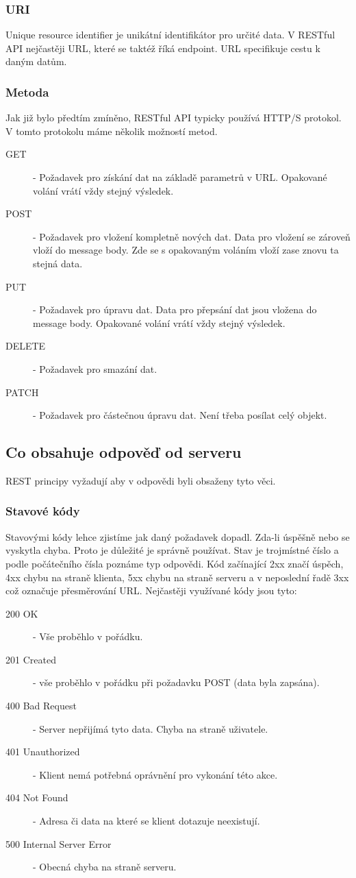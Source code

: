 \subsubsection{URI}
Unique resource identifier je unikátní identifikátor pro určité data. V RESTful API nejčastěji URL, které se taktéž říká endpoint. URL specifikuje cestu k daným datům.
\subsubsection{Metoda}
Jak již bylo předtím zmíněno, RESTful API typicky používá HTTP/S protokol. V tomto protokolu máme několik možností metod.

\begin{description}
	\item[GET] - Požadavek pro získání dat na základě parametrů v URL. Opakované volání vrátí vždy stejný výsledek.
	\item[POST] - Požadavek pro vložení kompletně nových dat. Data pro vložení se zároveň vloží do message body. Zde se s opakovaným voláním vloží zase znovu ta stejná data.
	\item[PUT] - Požadavek pro úpravu dat. Data pro přepsání dat jsou vložena do message body. Opakované volání vrátí vždy stejný výsledek.
	\item[DELETE] - Požadavek pro smazání dat.
	\item[PATCH] - Požadavek pro částečnou úpravu dat. Není třeba posílat celý objekt.
\end{description}

\subsection{Co obsahuje odpověď od serveru}
REST principy vyžadují aby v odpovědi byli obsaženy tyto věci.
\subsubsection{Stavové kódy}
Stavovými kódy lehce zjistíme jak daný požadavek dopadl. Zda-li úspěšně nebo se vyskytla chyba. Proto je důležité je správně používat. Stav je trojmístné číslo a podle počátečního čísla poznáme typ odpovědi. Kód začínající 2xx značí úspěch, 4xx chybu na straně klienta, 5xx chybu na straně serveru a v neposlední řadě 3xx což označuje přesměrování URL.
Nejčastěji využívané kódy jsou tyto:

\begin{description}
	\item[200 OK] - Vše proběhlo v pořádku.
	\item[201 Created] - vše proběhlo v pořádku při požadavku POST (data byla zapsána).
	\item[400 Bad Request] - Server nepřijímá tyto data. Chyba na straně uživatele.
	\item[401 Unauthorized] - Klient nemá potřebná oprávnění pro vykonání této akce.
	\item[404 Not Found] - Adresa či data na které se klient dotazuje neexistují.
	\item[500 Internal Server Error] - Obecná chyba na straně serveru.
\end{description}

